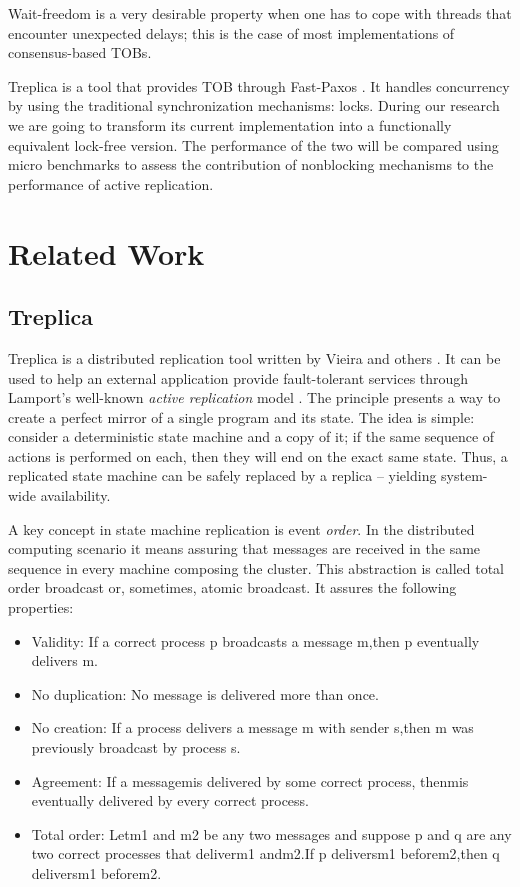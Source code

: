 \documentclass[12pt]{article}
\begin{document}
Wait-freedom is a very  desirable property when one has to cope with threads
that encounter unexpected delays; this  is the case
of  most  implementations of  consensus-based  TOBs.

Treplica \cite{vieira2008} is a tool that provides TOB through Fast-Paxos
\cite{Lamport2006}. It handles concurrency by using the traditional
synchronization mechanisms: locks. During our research we are going to transform
its current implementation  into a functionally equivalent lock-free version.
The  performance of the two will be compared using micro benchmarks to assess
the contribution  of nonblocking mechanisms to the  performance of active
replication.


\section{Related Work}
\label{sec:related}
\subsection{Treplica}
Treplica is a distributed replication tool written by Vieira and others \cite{vieira2008}. It can be used to help an external application provide fault-tolerant services through Lamport's well-known \textit{active replication} model \cite{Lamport1978}. The principle presents a way to create a perfect mirror of a single program and its state. The idea is simple: consider a deterministic state machine and a copy of it; if the same sequence of actions is performed on each, then they will end on the exact same state. Thus, a replicated state machine can be safely replaced by a replica -- yielding system-wide availability.

A key concept in state machine replication is event \textit{order}. In the distributed computing scenario it means assuring that messages are received in the same sequence in every machine composing the cluster. This abstraction is called total order broadcast or, sometimes, atomic broadcast. It assures the following properties:

\begin{itemize}
\item Validity: If a correct process p broadcasts a message m,then p eventually delivers m.
\item No duplication: No message is delivered more than once.
\item No creation: If a process delivers a message m with sender s,then m was previously broadcast by process s.
\item Agreement: If a messagemis delivered by some correct process, thenmis eventually delivered by every correct process.
\item Total order: Letm1 and m2 be any two messages and suppose p and q are any two correct processes that deliverm1 andm2.If p deliversm1 beforem2,then q deliversm1 beforem2.
\end{itemize}
\end{document}
